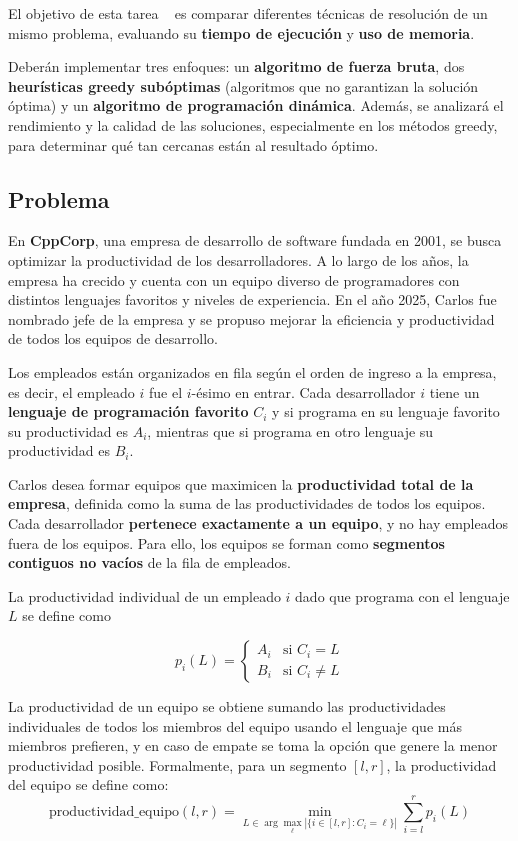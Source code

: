 El objetivo de esta tarea \tnum~ es comparar diferentes técnicas de resolución de un mismo problema, evaluando su \textbf{tiempo de ejecución} y \textbf{uso de memoria}. 

Deberán implementar tres enfoques: un \textbf{algoritmo de fuerza bruta}, dos \textbf{heurísticas greedy subóptimas} (algoritmos que no garantizan la solución óptima) y un \textbf{algoritmo de programación dinámica}. Además, se analizará el rendimiento y la calidad de las soluciones, especialmente en los métodos greedy, para determinar qué tan cercanas están al resultado óptimo.

\subsection{Problema}

En \textbf{CppCorp}, una empresa de desarrollo de software fundada en 2001, se busca optimizar la productividad de los desarrolladores. A lo largo de los años, la empresa ha crecido y cuenta con un equipo diverso de programadores con distintos lenguajes favoritos y niveles de experiencia. En el año 2025, Carlos fue nombrado jefe de la empresa y se propuso mejorar la eficiencia y productividad de todos los equipos de desarrollo.

Los empleados están organizados en fila según el orden de ingreso a la empresa, es decir, el empleado $i$ fue el $i$-ésimo en entrar. Cada desarrollador $i$ tiene un \textbf{lenguaje de programación favorito} $C_i$ y si programa en su lenguaje favorito su productividad es $A_i$, mientras que si programa en otro lenguaje su productividad es $B_i$.

Carlos desea formar equipos que maximicen la \textbf{productividad total de la empresa}, definida como la suma de las productividades de todos los equipos. Cada desarrollador \textbf{pertenece exactamente a un equipo}, y no hay empleados fuera de los equipos. Para ello, los equipos se forman como \textbf{segmentos contiguos no vacíos} de la fila de empleados.

La productividad individual de un empleado $i$ dado que programa con el lenguaje $L$ se define como

\[
p_i(L) =
\begin{cases}
A_i & \text{si } C_i = L \\
B_i & \text{si } C_i \neq L
\end{cases}
\]

La productividad de un equipo se obtiene sumando las productividades individuales de todos los miembros del equipo usando el lenguaje que más miembros prefieren, y en caso de empate se toma la opción que genere la menor productividad posible. Formalmente, para un segmento $[l,r]$, la productividad del equipo se define como:
\[
\text{productividad\_equipo}(l,r) = \min_{L \in \arg\max_\ell |\{ i \in [l,r] : C_i = \ell \}|} \sum_{i=l}^{r} p_i(L)
\]

